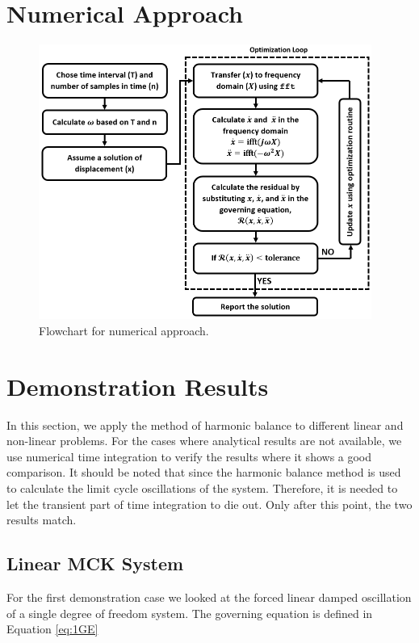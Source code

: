 \documentclass[12pt, a4paper]{extarticle}
\begin{document}
\section{Numerical Approach}

\begin{figure}[h]
	\centering
	\includegraphics[height=9.00cm]{figure/minimize_residual.png}
	\caption{Flowchart for numerical approach.}
	\label{fig:flowchart}
\end{figure}

\section{Demonstration Results}
In this section, we apply the method of harmonic balance to different linear and non-linear problems. For the cases where analytical results are not available, we use numerical time integration to verify the results where it shows a good comparison. It should be noted that since the harmonic balance method is used to calculate the limit cycle oscillations of the system. Therefore, it is needed to let the transient part of time integration to die out. Only after this point, the two results match.

\subsection{Linear MCK System}
For the first demonstration case we looked at the forced linear damped oscillation of a single degree of freedom system. The governing equation is defined in Equation \eqref{eq:1GE}
\end{document}
